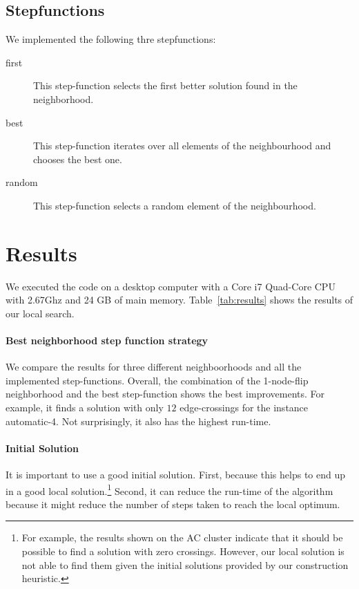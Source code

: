 \documentclass{scrartcl}
\begin{document}
\subsection{Stepfunctions}

We implemented the following thre stepfunctions:

\begin{description}
\item[first] This step-function selects the first better solution found in the neighborhood.
\item[best] This step-function iterates over all elements of the neighbourhood and chooses the best one.
\item[random] This step-function selects a random element of the neighbourhood. 
\end{description}




\section{Results}
We executed the code on a desktop computer with a Core i7 Quad-Core
CPU with 2.67Ghz and 24 GB of main memory. Table~\ref{tab:results}
shows the results of our local search. 


\paragraph{Best neighborhood step function strategy}
We compare the results for
three different neighboorhoods and all the implemented step-functions.
Overall, the combination of the 1-node-flip neighborhood and the best
step-function shows the best improvements. For example, it finds a
solution with only $12$ edge-crossings for the instance automatic-4.
Not surprisingly, it also has the highest run-time.

\paragraph{Initial Solution}
It is important to use a good initial solution. First, because this
helps to end up in a good local solution.\footnote{For example, the
  results shown on the AC cluster indicate that it should be possible
  to find a solution with zero crossings. However, our local solution
  is not able to find them given the initial solutions provided by our
  construction heuristic.} Second, it can reduce the run-time of the
algorithm because it might reduce the number of steps taken to reach
the local optimum.
\end{document}
